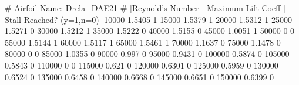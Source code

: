 # Airfoil Name: Drela_DAE21
# |Reynold's Number | Maximum Lift Coeff | Stall Reached? (y=1,n=0)|
10000 1.5405 1
15000 1.5379 1
20000 1.5312 1
25000 1.5271 0
30000 1.5212 1
35000 1.5222 0
40000 1.5155 0
45000 1.0051 1
50000 0   0
55000 1.5144 1
60000 1.5117 1
65000 1.5461 1
70000 1.1637 0
75000 1.1478 0
80000 0   0
85000 1.0355 0
90000 0.997 0
95000 0.9431 0
100000 0.5874 0
105000 0.5843 0
110000 0   0
115000 0.621 0
120000 0.6301 0
125000 0.5959 0
130000 0.6524 0
135000 0.6458 0
140000 0.6668 0
145000 0.6651 0
150000 0.6399 0
